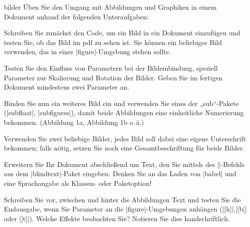 \documentclass[
	solution,
	blatt=7,
	ausgabe=28.\,05.\,2010,
	rückgabe=03.\,06.\,2010
]{lcourse-hd}
\begin{document}
\begin{exercise}[
  name={Abbildungen},
  punkte=7,
  abgabe = Quellcode per Mail und Quellcode ausgedruckt. Fertiges Dokument (pdf) per Mail. Beobachtungen zu den Parametern handschriftlich.]{bilder}
Üben Sie den Umgang mit Abbildungen und Graphiken in einem Dokument anhand der folgenden Unteraufgaben:

Schreiben Sie zunächst den Code, um ein Bild in ein Dokument einzufügen und testen Sie, ob das Bild im pdf zu sehen ist. Sie können ein beliebiges Bild verwenden, das in einer |figure|-Umgebung stehen sollte.

Testen Sie den Einfluss von Parametern bei der Bildeinbindung, speziell Parameter zur Skalierung und Rotation der Bilder. Geben Sie im fertigen Dokument mindestens zwei Parameter an.

Binden Sie nun ein weiteres Bild ein und verwenden Sie eines der „sub“-Pakete (|subfloat|, |subfigures|), damit beide Abbildungen eine einheitliche Numerierung bekommen. (Abbildung 1a, Abbildung 1b o.\,ä.)

Verwenden Sie zwei beliebige Bilder, jedes Bild soll dabei eine eigene Unterschrift bekommen; falls nötig, setzen Sie noch eine Gesamtbeschriftung für beide Bilder.

Erweitern Sie Ihr Dokument abschließend um Text, den Sie mittels des |\blindtext|-Befehls aus dem |blindtext|-Paket eingeben. Denken Sie an das Laden von |babel| und eine Sprachangabe als Klassen- oder Paketoption!

Schreiben Sie vor, zwischen und hinter die Abbildungen Text und testen Sie die Endausgabe, wenn Sie Parameter an die |figure|-Umgebungen anhängen (|[h]|,|[b]| oder |[t]|). Welche Effekte beobachten Sie? Notieren Sie dies handschriftlich.

\end{exercise}
\end{document}

